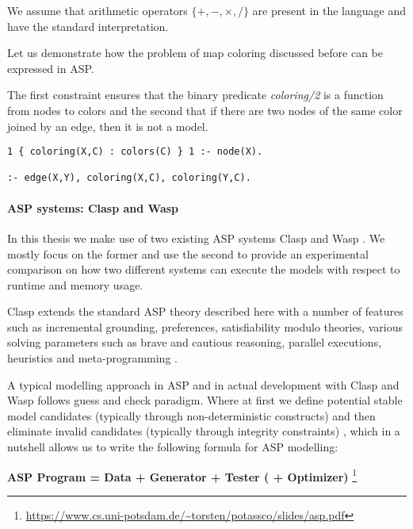 We assume that arithmetic operators $\{ +, -, \times, / \}$ are present in the language and have the standard interpretation.

\begin{example}
  Let us demonstrate how the problem of map coloring discussed before can be expressed in ASP. 

  The first constraint ensures that the binary predicate \textit{coloring/2} is a function from nodes to colors and the second that if there are two nodes of the same color joined by an edge, then it is not a model.
\begin{lstlisting}[caption=ASP encoding of map coloring constraints, label=lst:example_asp_coloring,basicstyle=\ttfamily]
1 { coloring(X,C) : colors(C) } 1 :- node(X).

:- edge(X,Y), coloring(X,C), coloring(Y,C).
\end{lstlisting}
\end{example}

\paragraph{ASP systems: Clasp and Wasp}
In this thesis we make use of two existing ASP systems Clasp \parencite{clasp} and Wasp \parencite{wasp}. We mostly focus on the former and use the second to provide an experimental comparison on how two different systems can execute the models with respect to runtime and memory usage.

Clasp extends the standard ASP theory described here with a number of features such as incremental grounding, preferences, satisfiability modulo theories, various solving parameters such as brave and cautious reasoning, parallel executions, heuristics and meta-programming \parencite{ASPbook}.

A typical modelling approach in ASP and in actual development with Clasp and Wasp follows guess and check paradigm. Where at first we define potential stable model candidates 
(typically through non-deterministic constructs) and then eliminate invalid candidates (typically through integrity constraints) \parencite{clasp, ASPbook, whatisasp}, which in a nutshell allows us to write the following formula for ASP modelling:

\begin{center}
    {\bfseries ASP Program = Data + Generator + Tester ( + Optimizer)} \footnote{\url{https://www.cs.uni-potsdam.de/~torsten/potassco/slides/asp.pdf}}
\end{center}

